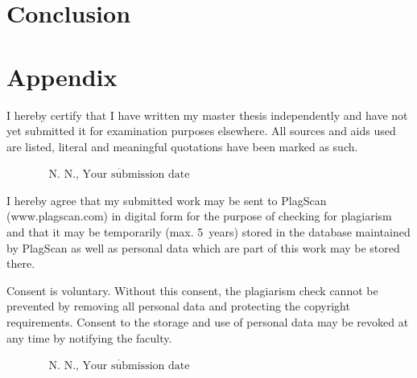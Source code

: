\documentclass[12pt,twoside,a4paper,parskip]{scrbook} %
\def\BaAuthor{Your Name}
\def\SubmitDate{Your submission date}
\def\ShowBaAuthor{\BaAuthor}
\def\ShowBaAuthor{N.~N.}
\begin{document}
\chapter{Conclusion}
\lipsum

\backmatter

\listoffigures
{}



\setcounter{chapter}{1}
\renewcommand{\thechapter}{\Alph{chapter}}
\chapter*{Appendix}\label{appendix}

\cleardoublepage
{}
{}
\printbibliography


I hereby certify that I have written my master thesis independently and have not yet submitted it for examination purposes elsewhere. All sources and aids used are listed, literal and meaningful quotations have been marked as such.

\vspace{20pt}
\begin{flushright}
$\overline{~~~~~~~~~~~~~~~~~\mbox{\ShowBaAuthor, \SubmitDate}~~~~~~~~~~~~~~~~~}$
\end{flushright}


I hereby agree that my submitted work may be sent to PlagScan (www.plagscan.com) in digital form for the purpose of checking for plagiarism and that it may be temporarily (max. 5~years) stored in the database maintained by PlagScan as well as personal data which are part of this work may be stored there.

\begin{small}
Consent is voluntary. Without this consent, the plagiarism check cannot be prevented by removing all personal data and protecting the copyright requirements. Consent to the storage and use of personal data may be revoked at any time by notifying the faculty.
\end{small}

\vspace{20pt}
\begin{flushright}
$\overline{~~~~~~~~~~~~~~~~~\mbox{\ShowBaAuthor, \SubmitDate}~~~~~~~~~~~~~~~~~}$
\end{flushright}
\end{document}
